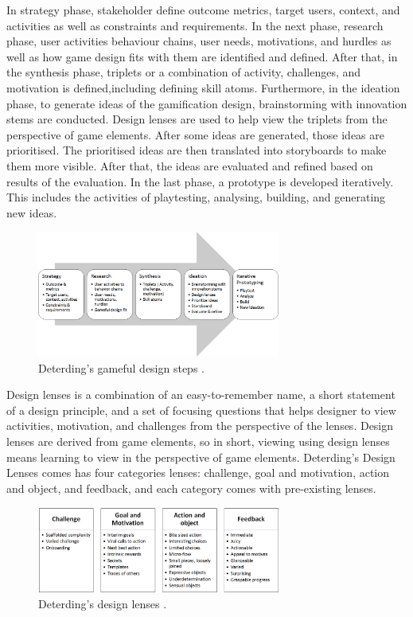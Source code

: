 \documentclass[12pt, a4paper]{report}
\begin{document}
In strategy phase, stakeholder define outcome metrics, target users, context, and activities as well as constraints and requirements. In the next phase, research phase, user activities behaviour chains, user needs, motivations, and hurdles as well as how game design fits with them are identified and defined. After that, in the synthesis phase, triplets or a combination of activity, challenges,  and motivation is defined,including defining skill atoms. Furthermore, in the ideation phase, to generate ideas of the gamification design, brainstorming with innovation stems are conducted. Design lenses are used to help view the triplets from the perspective of game elements. After some ideas are generated, those ideas are prioritised. The prioritised ideas are then translated into storyboards to make them more visible. After that, the ideas are evaluated and refined based on results of the evaluation. In the last phase, a prototype is developed iteratively. This includes the activities of playtesting, analysing, building, and generating new ideas.  

\begin{figure}[ht]
\centering
\includegraphics[width=8cm]{gameful-steps}
\caption{Deterding's gameful design steps \cite{deterding2015lens}.}
\label{fig:gameful-steps}
\end{figure}

Design lenses is a combination of an easy-to-remember name, a short statement of a design principle, and a set of focusing questions that helps designer to view activities, motivation, and challenges from the perspective of the lenses. Design lenses are derived from game elements, so in short, viewing using design lenses means learning to view in the perspective of game elements. Deterding's Design Lenses comes has four categories lenses: challenge, goal and motivation, action and object, and feedback, and each category comes with pre-existing lenses.

\begin{figure}[ht]
\centering
\includegraphics[width=8cm]{lenses}
\caption{Deterding's design lenses \cite{deterding2015lens}.}
\label{fig:lenses}
\end{figure}
\end{document}
